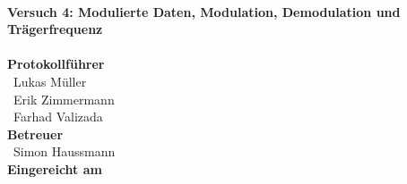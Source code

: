 \documentclass[a4paper, 11pt, oneside]{Thesis}  %
\begin{document}
\begin{titlepage}
\HRule \\[0.4cm]
{ \huge \bfseries Versuch 4: Modulierte Daten, Modulation, Demodulation und Trägerfrequenz}\\[0.4cm] %
\HRule \\[1.5cm]
 
\textbf{Protokollführer}\\
{\large\ Lukas Müller}\\[0.2cm]
{\large\ Erik Zimmermann}\\[0.2cm]
{\large\ Farhad Valizada}\\[0.7cm]

\textbf{Betreuer}\\
{\large\ Simon Haussmann}\\[0.2cm]




\textbf{Eingereicht am}\\


 

\vfill %

\end{titlepage}


\clearpage  %

\clearpage

\pagestyle{fancy}
\fancyhf{}
\fancyfoot[C]{\thepage} %
\renewcommand{\headrulewidth}{0pt}

\let\oldchapter\chapter
\renewcommand{\chapter}{\clearpage\pagestyle{fancy}\oldchapter}
\end{document}
